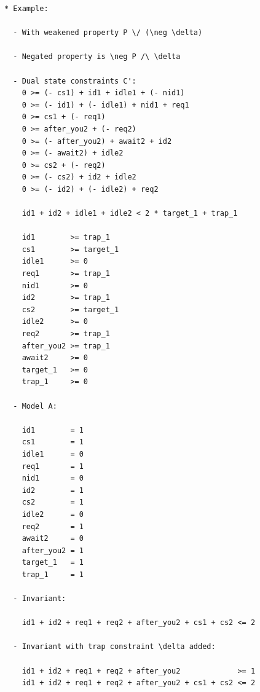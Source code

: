 \documentclass{article}
\begin{document}
\newpage
\begin{verbatim}
* Example:

  - With weakened property P \/ (\neg \delta)

  - Negated property is \neg P /\ \delta

  - Dual state constraints C':
    0 >= (- cs1) + id1 + idle1 + (- nid1)
    0 >= (- id1) + (- idle1) + nid1 + req1
    0 >= cs1 + (- req1)
    0 >= after_you2 + (- req2)
    0 >= (- after_you2) + await2 + id2
    0 >= (- await2) + idle2
    0 >= cs2 + (- req2)
    0 >= (- cs2) + id2 + idle2
    0 >= (- id2) + (- idle2) + req2

    id1 + id2 + idle1 + idle2 < 2 * target_1 + trap_1

    id1        >= trap_1
    cs1        >= target_1
    idle1      >= 0
    req1       >= trap_1
    nid1       >= 0
    id2        >= trap_1
    cs2        >= target_1
    idle2      >= 0
    req2       >= trap_1
    after_you2 >= trap_1
    await2     >= 0
    target_1   >= 0
    trap_1     >= 0

  - Model A:

    id1        = 1
    cs1        = 1
    idle1      = 0
    req1       = 1
    nid1       = 0
    id2        = 1
    cs2        = 1
    idle2      = 0
    req2       = 1
    await2     = 0
    after_you2 = 1
    target_1   = 1
    trap_1     = 1
    
  - Invariant:

    id1 + id2 + req1 + req2 + after_you2 + cs1 + cs2 <= 2
  
  - Invariant with trap constraint \delta added:
    
    id1 + id2 + req1 + req2 + after_you2             >= 1
    id1 + id2 + req1 + req2 + after_you2 + cs1 + cs2 <= 2

\end{verbatim}
\end{document}
